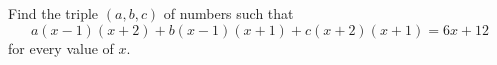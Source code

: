 Find the triple $(a,b,c)$ of numbers such that
\[a(x-1)(x+2)+b(x-1)(x+1)+c(x+2)(x+1)=6x+12\]
for every value of $x$.
